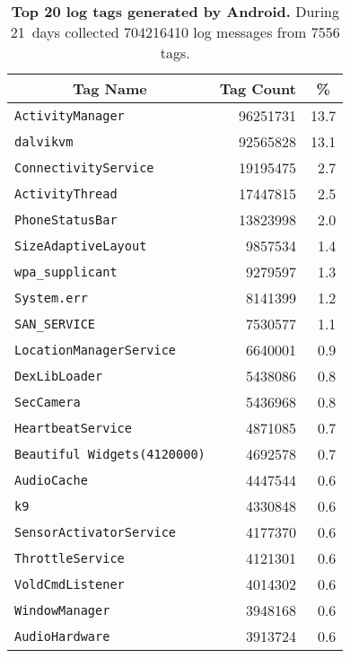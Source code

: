 \begin{table}[t]

{\small
\begin{tabularx}{\columnwidth}{Xrr}
\multicolumn{1}{c}{\normalsize{\textbf{Tag Name}}} & 
\multicolumn{1}{c}{\normalsize{\textbf{Tag Count}}} & 
\multicolumn{1}{c}{\normalsize{\textbf{\%}}} \\
\toprule
\texttt{ActivityManager} & \num{96251731} & 13.7 \\
\texttt{dalvikvm} & \num{92565828} & 13.1 \\
\texttt{ConnectivityService} & \num{19195475} & 2.7 \\
\texttt{ActivityThread} & \num{17447815} & 2.5 \\
\texttt{PhoneStatusBar} & \num{13823998} & 2.0 \\
\texttt{SizeAdaptiveLayout} & \num{9857534} & 1.4 \\
\texttt{wpa\_supplicant} & \num{9279597} & 1.3 \\
\texttt{System.err} & \num{8141399} & 1.2 \\
\texttt{SAN\_SERVICE} & \num{7530577} & 1.1 \\
\texttt{LocationManagerService} & \num{6640001} & 0.9 \\
\texttt{DexLibLoader} & \num{5438086} & 0.8 \\
\texttt{SecCamera} & \num{5436968} & 0.8 \\
\texttt{HeartbeatService} & \num{4871085} & 0.7 \\
\texttt{Beautiful Widgets(4120000)} & \num{4692578} & 0.7 \\
\texttt{AudioCache} & \num{4447544} & 0.6 \\
\texttt{k9} & \num{4330848} & 0.6 \\
\texttt{SensorActivatorService} & \num{4177370} & 0.6 \\
\texttt{ThrottleService} & \num{4121301} & 0.6 \\
\texttt{VoldCmdListener} & \num{4014302} & 0.6 \\
\texttt{WindowManager} & \num{3948168} & 0.6 \\
\texttt{AudioHardware} & \num{3913724} & 0.6 \\
\end{tabularx}
}

\caption{\textbf{Top 20 log tags generated by Android.} During 21~days
\PhoneLab{} collected \num{704216410} log messages from \num{7556} tags.}

\label{table-logtags}

\vspace*{-0.1in}
\end{table}
